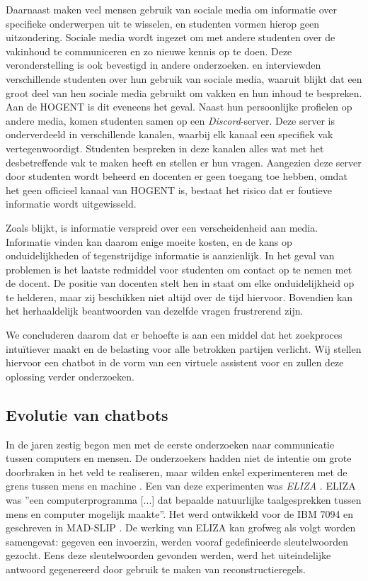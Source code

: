 Daarnaast maken veel mensen gebruik van sociale media om informatie over specifieke onderwerpen uit te wisselen, en studenten vormen hierop geen uitzondering. Sociale media wordt ingezet om met andere studenten over de vakinhoud te communiceren en zo nieuwe kennis op te doen. Deze veronderstelling is ook bevestigd in andere onderzoeken. \textcite{M.Talaue2018} en \textcite{Bal2017} interviewden verschillende studenten over hun gebruik van sociale media, waaruit blijkt dat een groot deel van hen sociale media gebruikt om vakken en hun inhoud te bespreken. Aan de HOGENT is dit eveneens het geval. Naast hun persoonlijke profielen op andere media, komen studenten samen op een \textit{Discord}-server. Deze server is onderverdeeld in verschillende kanalen, waarbij elk kanaal een specifiek vak vertegenwoordigt. Studenten bespreken in deze kanalen alles wat met het desbetreffende vak te maken heeft en stellen er hun vragen. Aangezien deze server door studenten wordt beheerd en docenten er geen toegang toe hebben, omdat het geen officieel kanaal van HOGENT is, bestaat het risico dat er foutieve informatie wordt uitgewisseld.

Zoals blijkt, is informatie verspreid over een verscheidenheid aan media. Informatie vinden kan daarom enige moeite kosten, en de kans op onduidelijkheden of tegenstrijdige informatie is aanzienlijk. In het geval van problemen is het laatste redmiddel voor studenten om contact op te nemen met de docent. De positie van docenten stelt hen in staat om elke onduidelijkheid op te helderen, maar zij beschikken niet altijd over de tijd hiervoor. Bovendien kan het herhaaldelijk beantwoorden van dezelfde vragen frustrerend zijn.

We concluderen daarom dat er behoefte is aan een middel dat het zoekproces intuïtiever maakt en de belasting voor alle betrokken partijen verlicht. Wij stellen hiervoor een chatbot in de vorm van een virtuele assistent voor en zullen deze oplossing verder onderzoeken.

\subsection{Evolutie van chatbots}
\label{sec:chatbots}

In de jaren zestig begon men met de eerste onderzoeken naar communicatie tussen computers en mensen. De onderzoekers hadden niet de intentie om grote doorbraken in het veld te realiseren, maar wilden enkel experimenteren met de grens tussen mens en machine \autocite{Dibitonto2018, AbuShawar2007}. Een van deze experimenten was \textit{ELIZA} \autocite{Weizenbaum1966}. ELIZA was ''een computerprogramma [...] dat bepaalde natuurlijke taalgesprekken tussen mens en computer mogelijk maakte''. Het werd ontwikkeld voor de IBM 7094 en geschreven in MAD-SLIP \autocite{Weizenbaum1966}. De werking van ELIZA kan grofweg als volgt worden samengevat: gegeven een invoerzin, werden vooraf gedefinieerde sleutelwoorden gezocht. Eens deze sleutelwoorden gevonden werden, werd het uiteindelijke antwoord gegenereerd door gebruik te maken van reconstructieregels.

